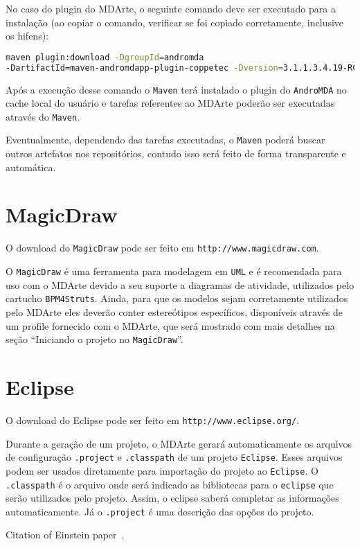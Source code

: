 No caso do plugin do MDArte, o seguinte comando deve ser executado para a
instalação (ao copiar o comando, verificar se foi copiado corretamente,
inclusive os hifens):

\begin{lstlisting}[language=bash]
maven plugin:download -DgroupId=andromda
-DartifactId=maven-andromdapp-plugin-coppetec -Dversion=3.1.1.3.4.19-RC2
\end{lstlisting}
	
Após a execução desse comando o \texttt{Maven} terá instalado o plugin do
\texttt{AndroMDA} no cache local do usuário e tarefas referentes ao MDArte
poderão ser executadas através do \texttt{Maven}.

Eventualmente, dependendo das tarefas executadas, o \texttt{Maven} poderá buscar
outros artefatos nos repositórios, contudo isso será feito de forma transparente
e automática.

\section{MagicDraw}

O download do \texttt{MagicDraw} pode ser feito em
\texttt{http://www.magicdraw.com}.

O \texttt{MagicDraw} é uma ferramenta para modelagem em \texttt{UML} e é
recomendada para uso com o MDArte devido a seu suporte a diagramas de atividade,
utilizados pelo cartucho \texttt{BPM4Struts}. Ainda, para que os modelos sejam
corretamente utilizados pelo MDArte eles deverão conter estereótipos
específicos, disponíveis através de um profile fornecido com o MDArte, que será
mostrado com mais detalhes na seção “Iniciando o projeto no \texttt{MagicDraw}”.

\section{Eclipse}

O download do Eclipse pode ser feito em \texttt{http://www.eclipse.org/}. 

Durante a geração de um projeto, o MDArte gerará automaticamente os arquivos de
configuração \texttt{.project} e \texttt{.classpath} de um projeto
\texttt{Eclipse}. Esses arquivos podem ser usados diretamente para importação do
projeto ao \texttt{Eclipse}. O \texttt{.classpath} é o arquivo onde será
indicado as bibliotecas para o \texttt{eclipse} que serão utilizados pelo
projeto. Assim, o eclipse saberá completar as informações automaticamente. Já o
\texttt{.project} é uma descrição das opções do projeto.

Citation of Einstein paper~\cite{Einstein}.